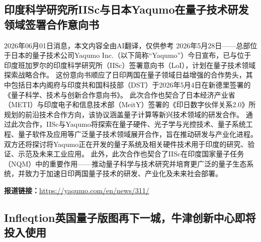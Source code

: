 \documentclass[12pt,a4paper]{ctexart}
\begin{document}
\subsection{ 印度科学研究所IISc与日本Yaqumo在量子技术研发领域签署合作意向书 }

2026年06月01日消息，本文内容全由AI翻译，仅供参考
2026年5月28日——总部位于日本的量子技术公司Yaqumo Inc.（以下简称“Yaqumo”）今日宣布，已与位于印度班加罗尔的印度科学研究所（IISc）签署意向书（LoI），计划在量子技术领域探索战略合作。
这份意向书顺应了日印两国在量子领域日益增强的合作势头，其中包括日本内阁府与印度共和国科技部（DST）于2026年5月4日在新德里签署的《量子科学、技术与创新合作意向书》。
此次合作也契合了日本经济产业省（METI）与印度电子和信息技术部（MeitY）签署的《印日数字伙伴关系2.0》所规划的前沿技术合作方向，该协议涵盖量子计算等新兴技术领域的研发合作。
通过此次合作，IISc与Yaqumo将探索在量子硬件、光子学与光控技术、量子系统工程、量子软件及应用等广泛量子技术领域展开合作，旨在推动研发与产业化进程。
双方还将探讨将Yaqumo正在开发的量子系统及相关硬件技术用于印度的研究、验证、示范及未来工业应用。
此外，此次合作也契合了IISc在印度国家量子任务（NQM）中的重要作用——推动量子科学与技术研究并培育更广泛的量子生态系统，并致力于加速日印两国量子技术的研发、产业化及未来社会部署。

\noindent\textbf{报道链接：}\url{https://yaqumo.com/en/news/311/}

\subsection{ Infleqtion英国量子版图再下一城，牛津创新中心即将投入使用 }
\end{document}
